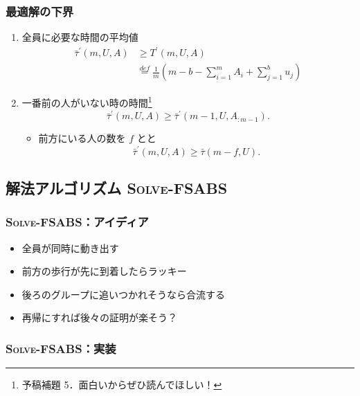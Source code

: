 \documentclass[dvipdfmx,12pt]{beamer}
\def\eqdef{\overset{def}{=}}
\begin{document}
\begin{frame}
  \frametitle{最適解の下界}
  \begin{enumerate}
  \item<1-> 全員に必要な時間の平均値
    \begin{align}
      \bar\tau^\prime(m, U, A) &\geq T^\prime(m, U, A) \\
      &\eqdef \frac{1}{m}(m - b - \sum_{i=1}^m A_i + \sum_{j=1}^b u_j)
    \end{align}
  \item<2-> 一番前の人がいない時の時間\footnote{\scriptsize{予稿補題 5．面白いからぜひ読んでほしい！}}
    \begin{equation}
      \bar\tau^\prime(m, U, A) \geq \bar\tau^\prime(m - 1, U, A_{:m-1}).
    \end{equation}
    \begin{itemize}
      \item<3-> 前方にいる人の数を $f$ とと
      \begin{equation}
        \bar\tau^\prime(m, U, A) \geq \bar\tau(m - f, U).
      \end{equation}
    \end{itemize}
  \end{enumerate}
\end{frame}

\subsection{解法アルゴリズム \textsc{Solve-FSABS}}
\begin{frame}
  \frametitle{\textsc{Solve-FSABS}：アイディア}
  \begin{itemize}
  \item 全員が同時に動き出す
  \item 前方の歩行が先に到着したらラッキー
  \item 後ろのグループに追いつかれそうなら合流する
  \item 再帰にすれば後々の証明が楽そう？
  \end{itemize}
\end{frame}

\begin{frame}
  \frametitle{\textsc{Solve-FSABS}：実装}
\end{frame}
\end{document}
